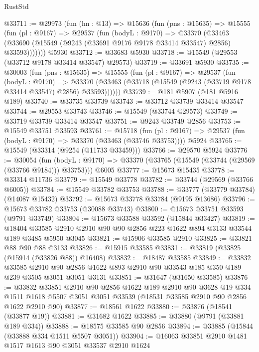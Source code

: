 \begin{lexlean}{RustStd}
\begin{coremodule}
@33711 := @29973
    (fun (hn : @13) =>
    @15636
      (fun (pns : @15635) =>
      @15555
        (fun (pl : @9167) =>
        @29537
          (fun (bodyL : @9170) =>
          @33370
            (@33463 (@33690 (@15549 (@9243 (@33691 @9176 @9178 @33414 @33547) @2856) @33593)))))))
    @5930
@33712 := @33683 @5930
@33718 := @15549 (@29553 (@33712 @9178 @33414 @33547) @29573)
@33719 := @33691 @5930
@33735 := @30003
    (fun (pns : @15635) =>
    @15555
      (fun (pl : @9167) =>
      @29537
        (fun (bodyL : @9170) =>
        @33370 (@33463 (@33718 (@15549 (@9243 (@33719 @9178 @33414 @33547) @2856) @33593))))))
@33739 := @181 @5907 (@181 @5916 @189)
@33740 := @33735 @33739
@33743 := @33712 @33739 @33414 @33547
@33744 := @29553 @33743
@33746 := @15549 (@33744 @29573)
@33749 := @33719 @33739 @33414 @33547
@33751 := @9243 @33749 @2856
@33753 := @15549 @33751 @33593
@33761 := @15718
    (fun (pl : @9167) => @29537 (fun (bodyL : @9170) => @33370 (@33463 (@33746 @33753))))
    @5924
@33765 := @15549 (@33314 (@9254 (@11733 @33459)))
@33766 := @29570 @5924
@33776 := @30054
    (fun (bodyL : @9170) => @33370 (@33765 (@15549 (@33744 (@29569 (@33766 @9184))) @33753)))
    @6005
@33777 := @15673 @15435
@33778 := @33314 @11736
@33779 := @15549 @33778
@33782 := @33744 (@29569 (@33766 @6005))
@33784 := @15549 @33782 @33753
@33788 := @33777 (@33779 @33784) (@14087 @15432)
@33792 := @15673 @33778 @33784 (@9195 @13686)
@33796 := @15673 @33782 @33753 (@30088 @33743)
@33800 := @15673 @33751 @33593 (@9791 @33749)
@33804 := @15673 @33588 @33592 (@15844 @33427)
@33819 := @18404
    @33585
    @2910
    @2910
    @90
    @90
    @2856
    @223
    @1622
    @894
    @3133
    @33544
    @189
    @3485
    @5950
    @3045
@33821 := @15906 @33585 @2910
@33825 := @33821 @88 @90 @88 @3133
@33826 := @15915 @33585
@33831 := @33819 (@33825 (@15914 (@33826 @88)) @16408)
@33832 := @18487 @33585
@33849 := @33832
    @33585
    @2910
    @90
    @2856
    @1622
    @893
    @2910
    @90
    @33543
    @185
    @350
    @189
    @239
    @3505
    @3051
    @3051
    @3131
@33851 := @31647 (@31650 @33585)
@33876 := @33832
    @33851
    @2910
    @90
    @2856
    @1622
    @189
    @2910
    @90
    @3628
    @19
    @334
    @1511
    @1618
    @5507
    @3051
    @3051
    @33539
    (@18531 @33585 @2910 @90 @2856 @1622 @2910 @90)
@33877 := @18561 @1622
@33880 := @33876 (@18541 (@33877 @19))
@33881 := @31682 @1622
@33885 := @33880 (@9791 (@33881 @189 @334))
@33888 := @18575 @33585 @90 @2856
@33894 := @33885 (@15844 (@33888 @334 @1511 @5507 @3051))
@33904 := @16063 @33851 @2910 @1481 @1517 @1613 @90 @3051 @33537 @2910 @1624

\end{coremodule}
\end{lexlean}
